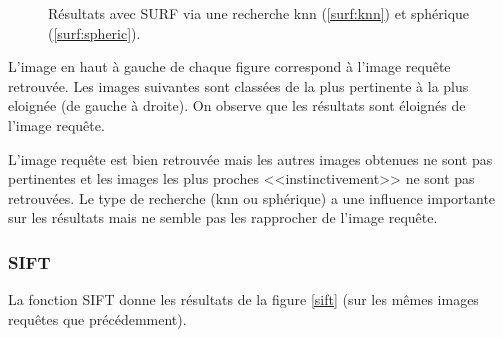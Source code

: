 \documentclass{article}
\begin{document}
\begin{figure}[!ht]%
  \centering
  \hspace{0.01\textwidth}
  \caption{Résultats avec SURF via une recherche knn (\ref{surf:knn}) et sphérique (\ref{surf:spheric}).}
  \label{surf}
\end{figure}

L'image en haut à gauche de chaque figure correspond à l'image requête retrouvée. Les images suivantes sont
classées de la plus pertinente à la plus eloignée (de gauche à droite).
On observe que les résultats sont éloignés de l'image requête. 

L'image requête est bien retrouvée mais les autres images obtenues ne sont pas pertinentes et les images les
plus proches <<instinctivement>> ne sont pas retrouvées. 
Le type de recherche (knn ou sphérique) a une influence importante sur les résultats mais ne semble pas les rapprocher de l'image requête. 

\subsubsection{SIFT}

La fonction SIFT donne les résultats de la figure \ref{sift} (sur les mêmes images requêtes que précédemment).
\end{document}

